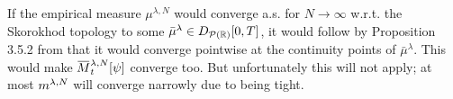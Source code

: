 If the empirical measure \(\mu^{\lambda, N}\) would converge a.s. for \( N\to\infty \) w.r.t. the Skorokhod topology to some \( \bar{\mu}^\lambda \in D_{\mathcal{P}(\mathbb{R})}[0,T] \), it would follow by Proposition 3.5.2 from \cite{ethierMarkovProcessesCharacterization1985} that it would converge pointwise at the continuity points of \( \bar{\mu}^\lambda \).
This would make \(\ol{M}_t^{\lambda, N}[\psi]\) converge too.   %
But unfortunately this will not apply; at most \(m^{\lambda,N}\) will converge narrowly due to being tight.  %
